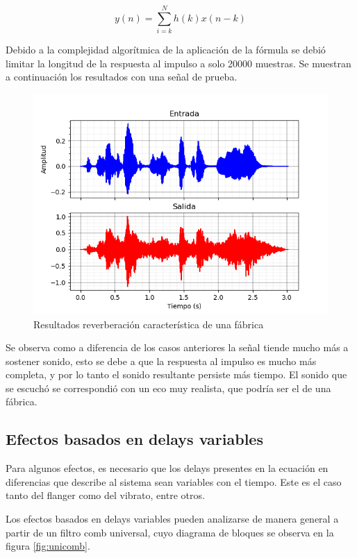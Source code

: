 \documentclass[assd_tp2_main.tex]{subfiles}
\begin{document}
\begin{equation}
y(n)=\sum_{i=k}^{N}h(k)x(n-k)
\end{equation}

Debido a la complejidad algorítmica de la aplicación de la fórmula se debió limitar la longitud de la respuesta al impulso a solo 20000 muestras. 
\newpage
Se muestran a continuación los resultados con una señal de prueba.

\begin{figure}[H]	
	\centering
	\includegraphics[scale=1]{graficos/EJ8/eco_convolucion.png}
	\caption{Resultados reverberación característica de una fábrica}
	\label{fig:bloqueElemental}
\end{figure}

Se observa como a diferencia de los casos anteriores la señal tiende mucho más a sostener sonido, esto se debe a que la respuesta al impulso es mucho más completa, y por lo tanto el sonido resultante persiste más tiempo.
El sonido que se escuchó se correspondió con un eco muy realista, que podría ser el de una fábrica.


\subsection{Efectos basados en delays variables} 

Para algunos efectos, es necesario que los delays presentes en la ecuaci\'on en diferencias que describe al sistema sean variables con el tiempo. Este es el caso tanto del flanger como del vibrato, entre otros.

Los efectos basados en delays variables pueden analizarse de manera general a partir de un filtro comb universal, cuyo diagrama de bloques se observa en la figura \ref{fig:unicomb}.
\end{document}

